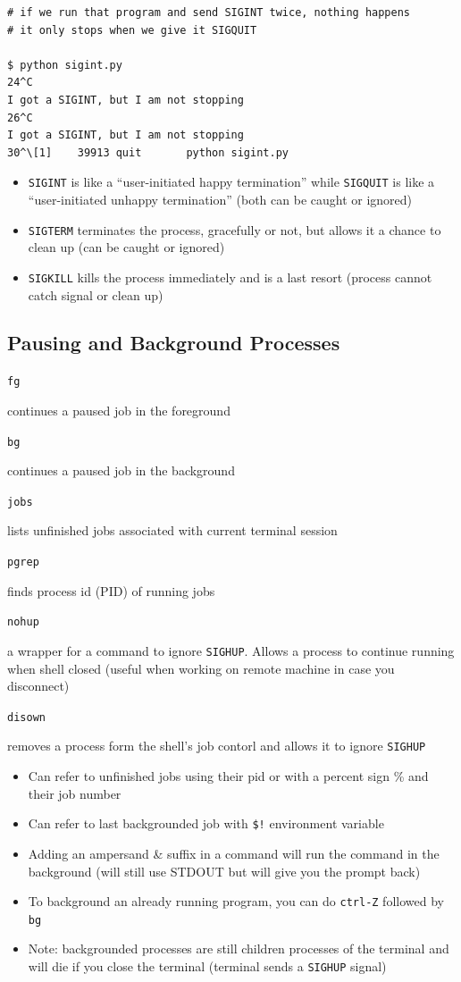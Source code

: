 \documentclass[letterpaper,12pt]{article}
\newcommand*{\lstitem}[1]{
  \setbox0\hbox{\lstinline{#1}}
  \item[\usebox0]
}
\begin{document}
\begin{lstlisting}
# if we run that program and send SIGINT twice, nothing happens
# it only stops when we give it SIGQUIT

$ python sigint.py
24^C
I got a SIGINT, but I am not stopping
26^C
I got a SIGINT, but I am not stopping
30^\[1]    39913 quit       python sigint.py
\end{lstlisting}

\begin{itemize}
 \item \lstinline{SIGINT} is like a ``user-initiated happy termination'' while \lstinline{SIGQUIT} is like a ``user-initiated unhappy termination'' (both can be caught or ignored)
 \item \lstinline{SIGTERM} terminates the process, gracefully or not, but allows it a chance to clean up (can be caught or ignored)
 \item \lstinline{SIGKILL} kills the process immediately and is a last resort (process cannot catch signal or clean up)
\end{itemize}

\subsection{Pausing and Background Processes}
\begin{description}
 \lstitem{fg} continues a paused job in the foreground
 \lstitem{bg} continues a paused job in the background
 \lstitem{jobs} lists unfinished jobs associated with current terminal session
 \lstitem{pgrep} finds process id (PID) of running jobs
 \lstitem{nohup} a wrapper for a command to ignore \lstinline{SIGHUP}. Allows a process to continue running when shell closed (useful when working on remote machine in case you disconnect)
 \lstitem{disown} removes a process form the shell's job contorl and allows it to ignore \lstinline{SIGHUP}
\end{description}

\begin{itemize}
 \item Can refer to unfinished jobs using their pid or with a percent sign \% and their job number
 \item Can refer to last backgrounded job with \lstinline{$!} environment variable
 \item Adding an ampersand \& suffix in a command will run the command in the background (will still use STDOUT but will give you the prompt back)
 \item To background an already running program, you can do \lstinline{ctrl-Z} followed by \lstinline{bg}
 \item Note: backgrounded processes are still children processes of the terminal and will die if you close the terminal (terminal sends a \lstinline{SIGHUP} signal)
\end{itemize}
\end{document}
